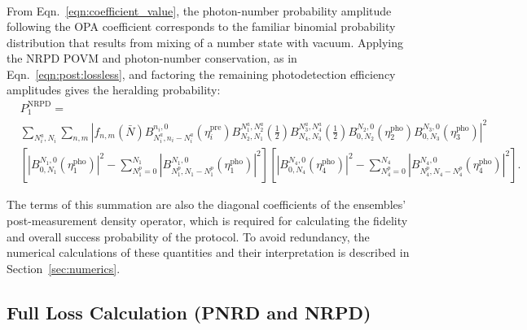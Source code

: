 \documentclass[aps,twocolumn,secnumarabic,amsmath,amssymb,pra,groupedaddress,
showpacs, showkeys,draft]{revtex4-1}
\newcommand{\pna}[1]{\left(#1\right)}
\newcommand{\pnb}[1]{\left[#1\right]}
\newcommand{\abs}[1]{\left|#1\right|}
\begin{document}
\begin{widetext}
\begin{align}
\end{align}
From Eqn.~\ref{eqn:coefficient_value}, the photon-number probability amplitude
following the OPA coefficient corresponds to the familiar binomial probability
distribution that results from mixing of a number state with vacuum. Applying
the NRPD POVM and photon-number conservation, as in
Eqn.~\ref{eqn:post:lossless}, and factoring the remaining photodetection
efficiency amplitudes gives the heralding probability:
\begin{align}
	&P_{1}^{\textrm{NRPD}}= \nonumber \\
	& \sum_{N_i^a,N_i}\sum_{n,m}
	\left|f_{n,m}\pna{\bar{N}}
	B_{N_i^a,n_i-N_i^a}^{n_i,0}\pna{\eta_i^{\textrm{pre}}}
	B_{N_2,N_1}^{N_1^a,N_2^a}\pna{\frac{1}{2}}
	B_{N_4,N_3}^{N_3^a,N_4^a}\pna{\frac{1}{2}} 
	B_{0,N_2}^{N_2,0}\pna{\eta_2^{\textrm{pho}}} 
	B_{0,N_3}^{N_3,0}\pna{\eta_3^{\textrm{pho}}}\right|^2\nonumber \\
	&  \pnb{\abs{B_{0,N_1}^{N_1,0}\pna{\eta_1^{\textrm{pho}}}}^2-\sum_{N_1^p=0}^{N_1} \abs{B_{N_1^p,N_1-N_1^p}^{N_1,0}\pna{\eta_1^{\textrm{pho}}}}^2} \pnb{\abs{B_{0,N_4}^{N_4,0}\pna{\eta_4^{\textrm{pho}}}}^2-\sum_{N_4^p=0}^{N_4} \abs{B_{N_4^p,N_4-N_4^p}^{N_4,0}\pna{\eta_4^{\textrm{pho}}}}^2}.
\end{align}
\end{widetext}
The terms of this summation are also the diagonal coefficients of the
ensembles' post-measurement density operator, which is required for calculating
the fidelity and overall success probability of the protocol. To avoid
redundancy, the numerical calculations of these quantities and their
interpretation is described in Section~\ref{sec:numerics}. 

\subsection{Full Loss Calculation (PNRD and NRPD)~\label{sec:numerics}}
\end{document}
